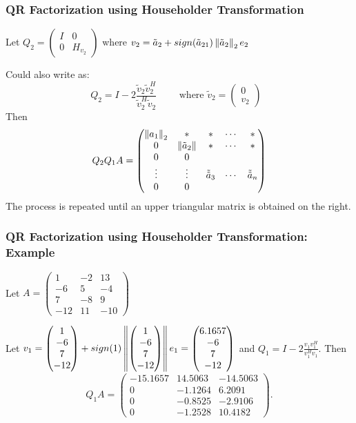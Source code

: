 \documentclass{beamer}
\begin{document}
\begin{frame}\frametitle{QR Factorization using Householder Transformation}
	Let $Q_2 = \begin{pmatrix} I&0\\0&H_{v_2}\end{pmatrix}$ where $v_2 = \tilde{a}_2 + sign(\tilde{a}_{21})\left\|\tilde{a}_2 \right\|_2e_2$
	
	Could also write as:
	\[ 
		Q_2 = I - 2\frac{\tilde{v}_2\tilde{v}_2^H}{\tilde{v}_2^H\tilde{v}_2} \qquad \text{ where $\tilde{v}_2 = \begin{pmatrix} 0\\v_2 \end{pmatrix}$ } 
	\]
	Then
	\[ 
		Q_2 Q_1 A =  
			\begin{pmatrix}
			    \left\|a_1 \right\|_2 & \ast & \ast & \cdots & \ast \\
			    0 & \left\|\tilde{a}_2\right\| & \ast & \cdots & \ast \\
			    0 & 0 & \\
			    \vdots & \vdots & \tilde{\tilde{a}}_3 & \cdots & \tilde{\tilde{a}}_n \\
			    0 & 0
			 \end{pmatrix}
	\]	
	The process is repeated until an upper triangular matrix is obtained on the right.
\end{frame}
\begin{frame}\frametitle{QR Factorization using Householder Transformation: Example}
	Let 
	\(
		A = 
			\begin{pmatrix}
				1 & -2 & 13 \\
              	-6 & 5 & -4 \\
              	7 & -8 & 9 \\
              	-12 & 11 & -10
			\end{pmatrix}
	\)
	
	Let 
	\(
		v_1 = 
			\begin{pmatrix} 1\\-6\\7\\-12\end{pmatrix} 
			+ sign(1)\left\|\begin{pmatrix} 1\\-6\\7\\-12\end{pmatrix}\right\| e_1 
			= \begin{pmatrix} 
				6.1657 \\ -6 \\7 \\ -12
			  \end{pmatrix}
	\)
	and $Q_1 = I - 2\frac{v_1v_1^H}{v_1^Hv_1}$.   Then
	\[
		Q_1A = 
			\begin{pmatrix}
				-15.1657 & 14.5063 & -14.5063 \\
				0 & -1.1264 & 6.2091\\
				0 & -0.8525 & -2.9106 \\
				0 & -1.2528 & 10.4182			
			\end{pmatrix}.
	\]
\end{frame}
\end{document}
